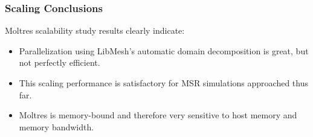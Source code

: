 \begin{frame}
        \frametitle{Scaling Conclusions}
        \begin{block}{Moltres scalability study results clearly indicate:}
        \begin{itemize} 
                \item Parallelization using LibMesh’s automatic domain 
                        decomposition is great, but not perfectly efficient.
                \item This scaling performance is satisfactory for MSR 
                        simulations approached thus far.
                \item Moltres is memory-bound and therefore very sensitive to host memory and memory bandwidth.
        \end{itemize}
        \end{block}
\end{frame}



